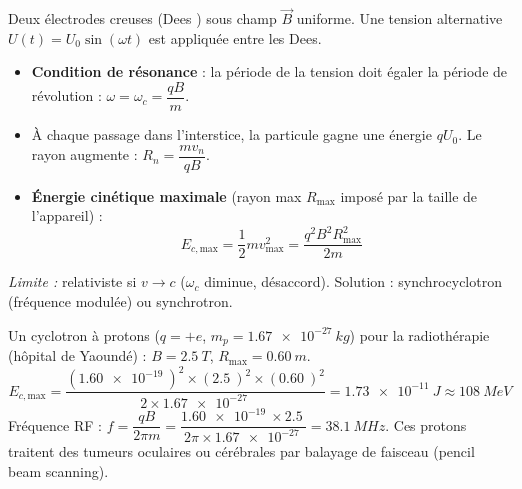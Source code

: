 \documentclass[11pt]{article}
\begin{document}
\begin{propriete}
Deux électrodes creuses (\og Dees \fg) sous champ $\vec{B}$ uniforme. Une tension alternative $U(t)=U_0\sin(\omega t)$ est appliquée entre les Dees.
\begin{itemize}
\item \textbf{Condition de résonance} : la période de la tension doit égaler la période de révolution : $\omega = \omega_c = \dfrac{qB}{m}$.
\item À chaque passage dans l'interstice, la particule gagne une énergie $qU_0$. Le rayon augmente : $R_n = \dfrac{m v_n}{qB}$.
\item \textbf{Énergie cinétique maximale} (rayon max $R_{\text{max}}$ imposé par la taille de l'appareil) :
  \[ E_{c,\text{max}} = \frac{1}{2}m v_{\text{max}}^2 = \frac{q^2 B^2 R_{\text{max}}^2}{2m} \]
\end{itemize}
\emph{Limite :} relativiste si $v \to c$ ($\omega_c$ diminue, désaccord). Solution : synchrocyclotron (fréquence modulée) ou synchrotron.
\end{propriete}

\begin{exemplebox}
Un cyclotron à protons ($q=+e$, $m_p=\SI{1,67e-27}{kg}$) pour la radiothérapie (hôpital de Yaoundé) : $B=\SI{2,5}{T}$, $R_{\text{max}}=\SI{0,60}{m}$.
\[ E_{c,\text{max}} = \frac{(\SI{1,60e-19}{})^2 \times (\SI{2,5}{})^2 \times (\SI{0,60}{})^2}{2 \times \SI{1,67e-27}{}} = \SI{1,73e-11}{J} \approx \SI{108}{MeV} \]
Fréquence RF : $f = \dfrac{qB}{2\pi m} = \dfrac{\SI{1,60e-19}{}\times\SI{2,5}{}}{2\pi\times\SI{1,67e-27}{}} = \SI{38,1}{MHz}$.
Ces protons traitent des tumeurs oculaires ou cérébrales par balayage de faisceau (pencil beam scanning).
\end{exemplebox}
\end{document}
